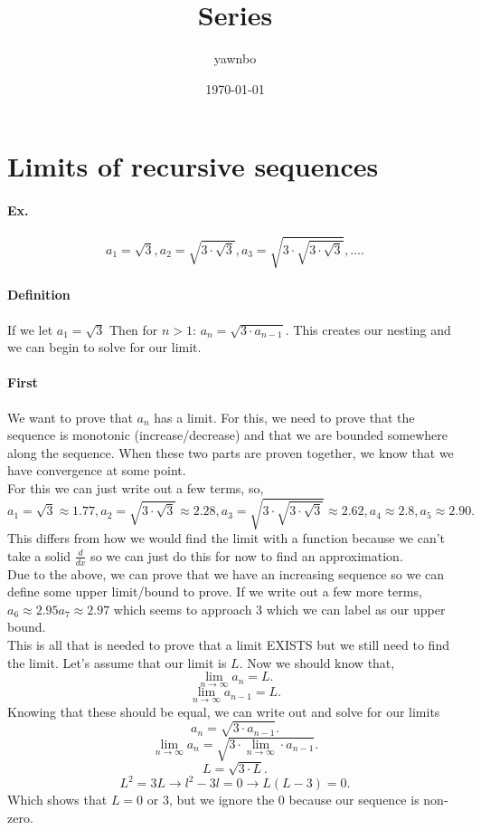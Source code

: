 \documentclass[a4paper]{article}
\title{Series}
\author{yawnbo}
\date{\today}
\begin{document}
\section{Limits of recursive sequences}%
\label{sec:Limits of recursive sequences}

\paragraph{Ex.}%
\label{par:Ex.}

\[
a_1 = \sqrt{ 3}, a_2 = \sqrt{ 3 \cdot \sqrt{ 3}}, a_3 = \sqrt{ 3 \cdot \sqrt{ 3 \cdot \sqrt{ 3}}}, \ldots
.\] 

\paragraph{Definition\\}

If we let $ a_1 = \sqrt{ 3} $ Then for $ n>1 $: $ a_n = \sqrt{ 3\cdot a_{ n-1 }} $.
This creates our nesting and we can begin to solve for our limit. 

\paragraph{First \\}
We want to prove that $ a_n $ has a limit. For this, we need to prove that the sequence is monotonic (increase/decrease) and that we are bounded somewhere along the sequence. When these two parts are proven together, we know that we have convergence at some point. \\

For this we can just write out a few terms, so,
\[
a_1 = \sqrt{ 3} \approx 1.77, a_2 = \sqrt{ 3\cdot \sqrt{ 3}} \approx 2.28, a_3 = \sqrt{ 3\cdot \sqrt{ 3\cdot \sqrt{ 3}}} \approx 2.62, a_{ 4 } \approx 2.8 , a_{ 5 } \approx 2.90
.\] 
This differs from how we would find the limit with a function because we can't take a solid $ \frac{ d }{ dx }  $ so we can just do this for now to find an approximation.\\

Due to the above, we can prove that we have an increasing sequence so we can define some upper limit/bound to prove. If we write out a few more terms, $ a_6 \approx 2.95 a_7 \approx 2.97 $ which seems to approach 3 which we can label as our upper bound. \\

This is all that is needed to prove that a limit EXISTS but we still need to find the limit. Let's assume that our limit is $ L $. Now we should know that,
\[
\lim_{ n \to \infty} a_n = L
.\] 
\[
\lim_{ n \to \infty} a_{ n-1 }= L 
.\] 
\newpage
Knowing that these should be equal, we can write out and solve for our limits
\[
a_n = \sqrt{ 3\cdot a_{ n-1 }}
.\] 
\[
\lim_{ n \to \infty} a_n = \sqrt{ 3\cdot \lim_{ n \to \infty} \cdot a_{ n-1 }}
.\] 
\[
L = \sqrt{ 3\cdot L}
.\] 
\[
L^2=3L \to l^2-3l = 0 \to L(L-3) = 0
.\] 
Which shows that $ L = 0 \text{ or }3 $, but we ignore the 0 because our sequence is non-zero. 
\end{document}
